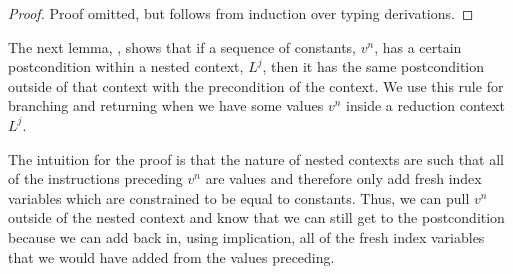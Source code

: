 \begin{proof}
    Proof omitted, but follows from induction over typing derivations.
\end{proof}

The next lemma, , shows that if a sequence of constants, $v^n$, has a certain postcondition within a nested context, $L^j$, then it has the same postcondition outside of that context with the precondition of the context.
We use this rule for branching and returning when we have some values $v^n$ inside a reduction context $L^j$.

The intuition for the proof is that the nature of nested contexts are such that all of the instructions preceding $v^n$ are values and therefore only add fresh index variables which are constrained to be equal to constants.
Thus, we can pull $v^n$ outside of the nested context and know that we can still get to the postcondition because we can add back in, using implication, all of the fresh index variables that we would have added from the values preceding.


